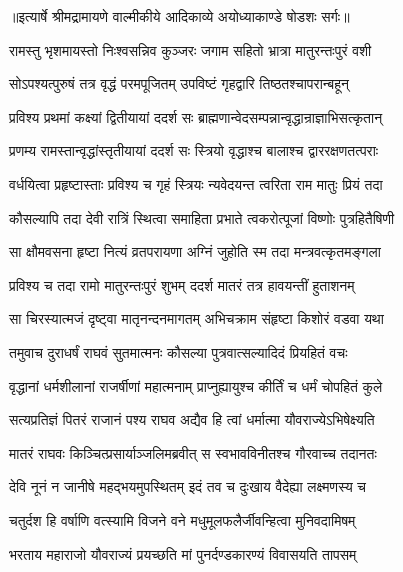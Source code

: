 {॥इत्यार्षे श्रीमद्रामायणे वाल्मीकीये आदिकाव्ये अयोध्याकाण्डे षोडशः सर्गः॥}


\twolineshloka
{रामस्तु भृशमायस्तो निःश्वसन्निव कुञ्जरः}
{जगाम सहितो भ्रात्रा मातुरन्तःपुरं वशी} %

\twolineshloka
{सोऽपश्यत्पुरुषं तत्र वृद्धं परमपूजितम्}
{उपविष्टं गृहद्वारि तिष्ठतश्चापरान्बहून्} %

\twolineshloka
{प्रविश्य प्रथमां कक्ष्यां द्वितीयायां ददर्श सः}
{ब्राह्मणान्वेदसम्पन्नान्वृद्धान्राज्ञाभिसत्कृतान्} %

\twolineshloka
{प्रणम्य रामस्तान्वृद्धांस्तृतीयायां ददर्श सः}
{स्त्रियो वृद्धाश्च बालाश्च द्वाररक्षणतत्पराः} %

\twolineshloka
{वर्धयित्वा प्रहृष्टास्ताः प्रविश्य च गृहं स्त्रियः}
{न्यवेदयन्त त्वरिता राम मातुः प्रियं तदा} %

\twolineshloka
{कौसल्यापि तदा देवी रात्रिं स्थित्वा समाहिता}
{प्रभाते त्वकरोत्पूजां विष्णोः पुत्रहितैषिणी} %

\twolineshloka
{सा क्षौमवसना हृष्टा नित्यं व्रतपरायणा}
{अग्निं जुहोति स्म तदा मन्त्रवत्कृतमङ्गला} %

\twolineshloka
{प्रविश्य च तदा रामो मातुरन्तःपुरं शुभम्}
{ददर्श मातरं तत्र हावयन्तीं हुताशनम्} %

\twolineshloka
{सा चिरस्यात्मजं दृष्ट्वा मातृनन्दनमागतम्}
{अभिचक्राम संहृष्टा किशोरं वडवा यथा} %

\twolineshloka
{तमुवाच दुराधर्षं राघवं सुतमात्मनः}
{कौसल्या पुत्रवात्सल्यादिदं प्रियहितं वचः} %

\twolineshloka
{वृद्धानां धर्मशीलानां राजर्षीणां महात्मनाम्}
{प्राप्नुह्यायुश्च कीर्तिं च धर्मं चोपहितं कुले} %

\twolineshloka
{सत्यप्रतिज्ञं पितरं राजानं पश्य राघव}
{अद्यैव हि त्वां धर्मात्मा यौवराज्येऽभिषेक्ष्यति} %

\twolineshloka
{मातरं राघवः किञ्चित्प्रसार्याञ्जलिमब्रवीत्}
{स स्वभावविनीतश्च गौरवाच्च तदानतः} %

\twolineshloka
{देवि नूनं न जानीषे महद्भयमुपस्थितम्}
{इदं तव च दुःखाय वैदेह्या लक्ष्मणस्य च} %

\twolineshloka
{चतुर्दश हि वर्षाणि वत्स्यामि विजने वने}
{मधुमूलफलैर्जीवन्हित्वा मुनिवदामिषम्} %

\twolineshloka
{भरताय महाराजो यौवराज्यं प्रयच्छति}
{मां पुनर्दण्डकारण्यं विवासयति तापसम्} %

